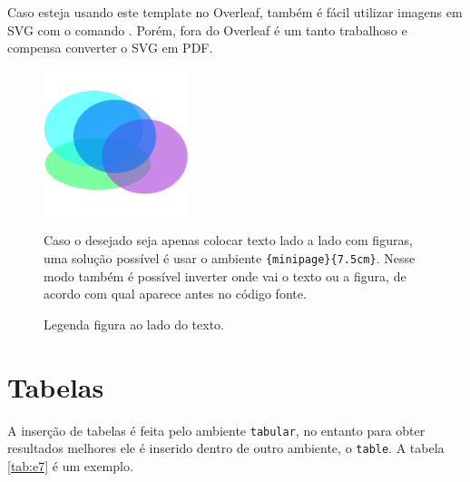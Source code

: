     Caso esteja usando este template no Overleaf, também é fácil utilizar imagens em SVG com o comando \lstinline[language=TeX, style=Code]||.
    Porém, fora do Overleaf é um tanto trabalhoso e compensa converter o SVG em PDF.

    \begin{figure}[htb]
        \centering
        \begin{minipage}{7.5cm}
            \centering
            \includegraphics[width=120pt]{images/figure.pdf}
            \caption{Legenda figura ao lado do texto.}
            \label{fig:texto_do_lado}
        \end{minipage}
        \hfill
        \begin{minipage}{7.5cm}
            \linespread{1.5}\selectfont
            
            Caso o desejado seja apenas colocar texto lado a lado com figuras, uma solução possível é usar o ambiente \lstinline[language=TeX,style=code]|{minipage}{7.5cm}|.
            Nesse modo também é possível inverter onde vai o texto ou a figura, de acordo com qual aparece antes no código fonte.

        \end{minipage}
    \end{figure}


\section{Tabelas}
\label{sec:tabelas}

    A inserção de tabelas é feita pelo ambiente \lstinline[language=TeX, style=Code]|tabular|, no entanto para obter resultados melhores ele é inserido dentro de outro ambiente, o \lstinline[language=TeX, style=Code]|table|.
    A tabela \ref{tab:e7} é um exemplo.


